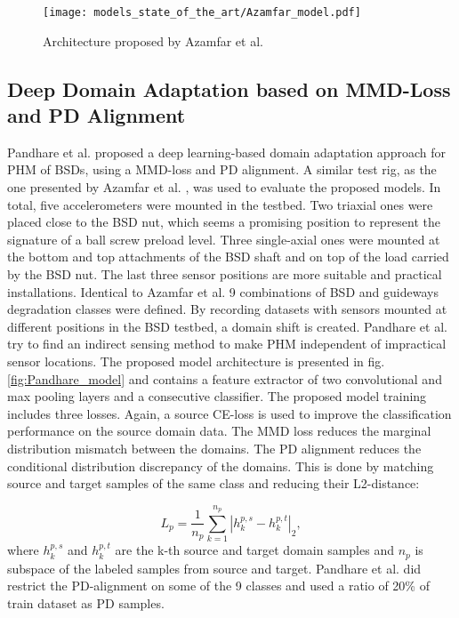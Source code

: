 \begin{figure}[H]
  \centering
  \texttt{[image: models\_state\_of\_the\_art/Azamfar\_model.pdf]}
  \caption{Architecture proposed by Azamfar et al. \cite{AZAMFAR2020103932}}
  \label{fig:Azamfar_model}
\end{figure}


\subsection{Deep Domain Adaptation based on MMD-Loss and PD Alignment}
Pandhare et al. \cite{Pandhare2021} proposed a deep learning-based domain adaptation approach for PHM of BSDs, using a MMD-loss and PD alignment. A similar test rig, as the one presented by Azamfar et al. \cite{AZAMFAR2020103932}, was used to evaluate the proposed models. In total, five accelerometers were mounted in the testbed. Two triaxial ones were placed close to the BSD nut, which seems a promising position to represent the signature of a ball screw preload level. Three single-axial ones were mounted at the bottom and top attachments of the BSD shaft and on top of the load carried by the BSD nut. The last three sensor positions are more suitable and practical installations. Identical to Azamfar et al. \cite{AZAMFAR2020103932} 9 combinations of BSD and guideways degradation classes were defined. By recording datasets with sensors mounted at different positions in the BSD testbed, a domain shift is created. Pandhare et al. try to find an indirect sensing method to make PHM independent of impractical sensor locations. The proposed model architecture is presented in fig. \ref{fig:Pandhare_model} and contains a feature extractor of two convolutional and max pooling layers and a consecutive classifier. The proposed model training includes three losses. Again, a source CE-loss is used to improve the classification performance on the source domain data. The MMD loss reduces the marginal distribution mismatch between the domains. The PD alignment reduces the conditional distribution discrepancy of the domains. This is done by matching source and target samples of the same class and reducing their L2-distance: 

\begin{equation}
    L_{p} = \frac{1}{n_{p}}\sum_{k=1}^{n_{p}}|h_{k}^{p,s}-h_{k}^{p,t}|_{2}, 
\end{equation}
where $h_{k}^{p,s}$ and $h_{k}^{p,t}$ are the k-th source and target domain samples and $n_{p}$ is subspace of the labeled samples from source and target. Pandhare et al. did restrict the PD-alignment on some of the 9 classes and used a ratio of 20\% of train dataset as PD samples. 

